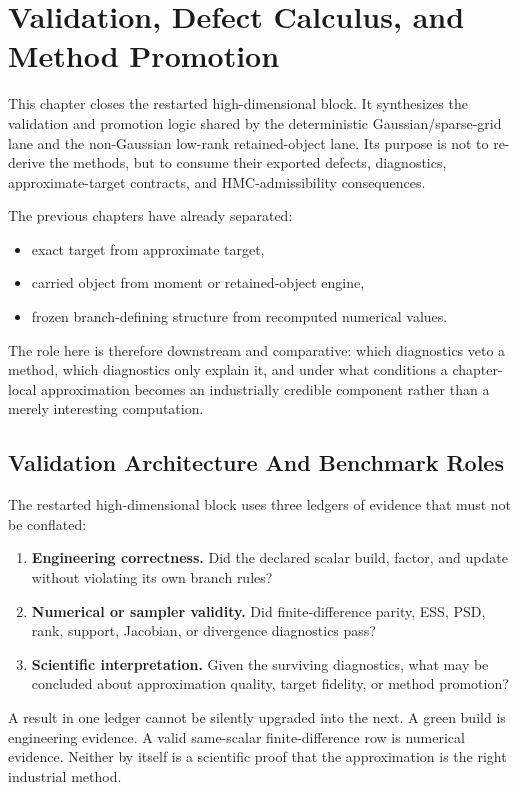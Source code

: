 \chapter{Validation, Defect Calculus, and Method Promotion}
\label{ch:bf-highdim-validation-defect-promotion}
\label{ch:bf-highdim-candidate-synthesis}

This chapter closes the restarted high-dimensional block.  It synthesizes the
validation and promotion logic shared by the deterministic Gaussian/sparse-grid
lane and the non-Gaussian low-rank retained-object lane.  Its purpose is not to
re-derive the methods, but to consume their exported defects, diagnostics,
approximate-target contracts, and HMC-admissibility consequences.

The previous chapters have already separated:
\begin{itemize}[leftmargin=0.28in]
  \item exact target from approximate target,
  \item carried object from moment or retained-object engine,
  \item frozen branch-defining structure from recomputed numerical values.
\end{itemize}
The role here is therefore downstream and comparative: which diagnostics veto a
method, which diagnostics only explain it, and under what conditions a chapter-
local approximation becomes an industrially credible component rather than a
merely interesting computation.

\section{Validation Architecture And Benchmark Roles}
\label{sec:bf-hd-validation-architecture}

The restarted high-dimensional block uses three ledgers of evidence that must not
be conflated:
\begin{enumerate}[label=(\arabic*)]
  \item \textbf{Engineering correctness.}  Did the declared scalar build, factor,
  and update without violating its own branch rules?
  \item \textbf{Numerical or sampler validity.}  Did finite-difference parity,
  ESS, PSD, rank, support, Jacobian, or divergence diagnostics pass?
  \item \textbf{Scientific interpretation.}  Given the surviving diagnostics,
  what may be concluded about approximation quality, target fidelity, or method
  promotion?
\end{enumerate}
A result in one ledger cannot be silently upgraded into the next.  A green build
is engineering evidence.  A valid same-scalar finite-difference row is numerical
evidence.  Neither by itself is a scientific proof that the approximation is the
right industrial method.

